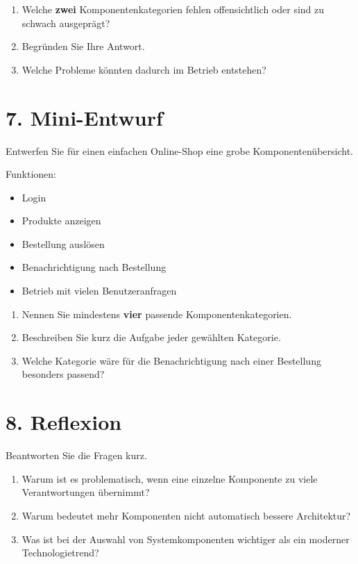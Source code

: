 \documentclass[11pt,a4paper]{article}
\begin{document}
\begin{enumerate}
  \item Welche \textbf{zwei} Komponentenkategorien fehlen offensichtlich oder sind zu schwach ausgeprägt?
  \item Begründen Sie Ihre Antwort.
  \item Welche Probleme könnten dadurch im Betrieb entstehen?
\end{enumerate}

\section*{7. Mini-Entwurf}
Entwerfen Sie für einen einfachen Online-Shop eine grobe Komponentenübersicht.

Funktionen:
\begin{itemize}
  \item Login
  \item Produkte anzeigen
  \item Bestellung auslösen
  \item Benachrichtigung nach Bestellung
  \item Betrieb mit vielen Benutzeranfragen
\end{itemize}

\begin{enumerate}
  \item Nennen Sie mindestens \textbf{vier} passende Komponentenkategorien.
  \item Beschreiben Sie kurz die Aufgabe jeder gewählten Kategorie.
  \item Welche Kategorie wäre für die Benachrichtigung nach einer Bestellung besonders passend?
\end{enumerate}

\section*{8. Reflexion}
Beantworten Sie die Fragen kurz.

\begin{enumerate}
  \item Warum ist es problematisch, wenn eine einzelne Komponente zu viele Verantwortungen übernimmt?
  \item Warum bedeutet \glqq mehr Komponenten\grqq{} nicht automatisch \glqq bessere Architektur\grqq{}?
  \item Was ist bei der Auswahl von Systemkomponenten wichtiger als ein moderner Technologietrend?
\end{enumerate}
\end{document}
